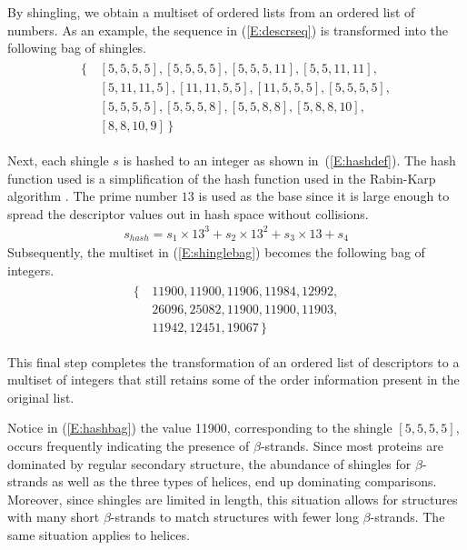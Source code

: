 \documentclass[a4,center,fleqn]{NAR}
\begin{document}
By shingling, we obtain a multiset of ordered lists from an ordered list of numbers. 
As an example, the sequence in (\ref{E:descrseq}) is transformed into the following bag of shingles. 
\begin{align}\label{E:shinglebag}
    \begin{split}
    \{\,&[5, 5, 5, 5], [5, 5, 5, 5], [5, 5, 5, 11], [5, 5, 11, 11], \\
        & [5, 11, 11, 5], [11, 11, 5, 5], [11, 5, 5, 5], [5, 5, 5, 5], \\
        & [5, 5, 5, 5], [5, 5, 5, 8], [5, 5, 8, 8], [5, 8, 8, 10], \\
        & [8, 8, 10, 9] \,\}
    \end{split}
\end{align}

Next, each shingle $s$ is hashed to an integer as shown in~(\ref{E:hashdef}). 
The hash function used is a simplification of the hash function used in the Rabin-Karp algorithm \cite{Karp1987}.
The prime number $13$ is used as the base since it is large enough to spread the descriptor values out in hash space without collisions. 
\begin{gather}\label{E:hashdef}
    s_{hash} = s_1 \times 13^3 + s_2 \times 13^2 + s_3 \times 13 + s_4
\end{gather}
Subsequently, the multiset in (\ref{E:shinglebag}) becomes the following bag of integers.
\begin{align}\label{E:hashbag}
    \begin{split}
    \{\,&11900, 11900, 11906, 11984, 12992, \\
        &26096, 25082, 11900, 11900, 11903, \\
        &11942, 12451, 19067 \,\}
    \end{split}
\end{align}

This final step completes the transformation of an ordered list of descriptors to a multiset of integers that still retains some of the order information present in the original list. 

Notice in (\ref{E:hashbag}) the value 11900, corresponding to the shingle $[ 5, 5, 5, 5 ]$, occurs frequently indicating the presence of $\beta$-strands. 
Since most proteins are dominated by regular secondary structure, the abundance of shingles for $\beta$-strands as well as the three types of helices, end up dominating comparisons. 
Moreover, since shingles are limited in length, this situation allows for structures with many short $\beta$-strands to match structures with fewer long $\beta$-strands.
The same situation applies to helices. 
\end{document}
